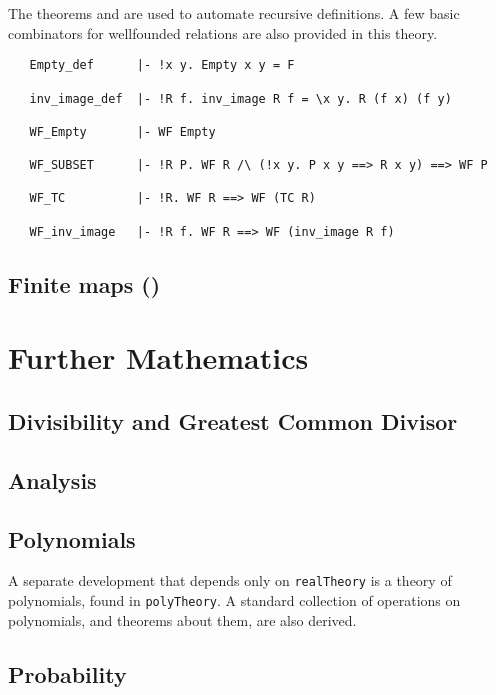 \noindent The theorems  and
 are used to automate recursive definitions. A
few basic combinators for wellfounded relations are also provided in
this theory.

\begin{hol}
\begin{verbatim}
   Empty_def      |- !x y. Empty x y = F

   inv_image_def  |- !R f. inv_image R f = \x y. R (f x) (f y)

   WF_Empty       |- WF Empty

   WF_SUBSET      |- !R P. WF R /\ (!x y. P x y ==> R x y) ==> WF P

   WF_TC          |- !R. WF R ==> WF (TC R)

   WF_inv_image   |- !R f. WF R ==> WF (inv_image R f)
\end{verbatim}
\end{hol}

\subsection{Finite maps ()}\label{finite_map}

\section{Further Mathematics}

\subsection{Divisibility and Greatest Common Divisor}

\subsection{Analysis}

\subsection{Polynomials}

A separate development that depends only on {\small\verb+realTheory+} is
a theory of polynomials, found in {\small\verb+polyTheory+}. A standard
collection of operations on polynomials, and theorems about them, are
also derived.

\subsection{Probability}

